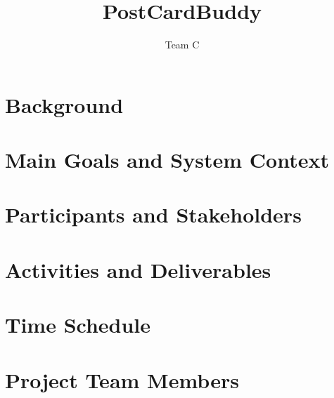 \documentclass[10pt,a4paper]{article}
\title{PostCardBuddy}
\author{Team C}
\begin{document}
\maketitle
\newpage
\tableofcontents


\section{Background}


\section{Main Goals and System Context}

\section{Participants and Stakeholders}

\section{Activities and Deliverables}

\section{Time Schedule}

\section{Project Team Members}
\end{document}
